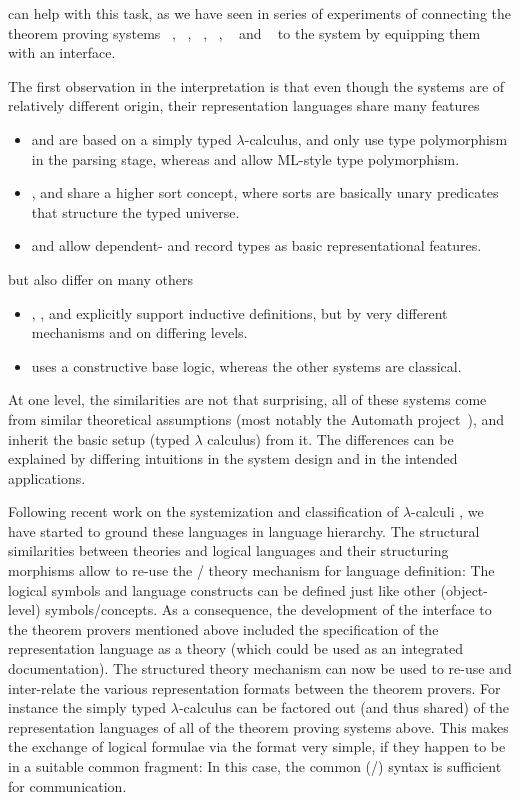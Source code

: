 {\omdoc} can help with this task, as we have seen in series of
experiments of connecting the theorem proving systems
{\OMEGA}~\cite{BenzmuellerEtAl:otama97}, {\inka}~\cite{HuSe:itng96},
{\pvs}~\cite{OwRu92}, {\lambdaclam}~\cite{RicSmaGre:ppihol98},
{\tps}~\cite{AnBi:tatps96} and {\coq}~\cite{CoqManual} to the {\mbase}
system by equipping them with an {\omdoc} interface.

The first observation in the interpretation is that even though the systems are of
relatively different origin, their representation languages share many features
\begin{itemize}
\item {\tps} and {\pvs} are based on a simply typed $\lambda$-calculus, and only
  use type polymorphism in the parsing stage, whereas {\OMEGA} and {\lambdaclam}
  allow ML-style type polymorphism.
\item {\OMEGA}, {\inka} and {\pvs} share a higher sort concept, where sorts are
  basically unary predicates that structure the typed universe.
\item {\pvs} and {\coq} allow dependent- and record types as basic
  representational features. 
\end{itemize}
but also differ on many others
\begin{itemize}
\item {\inka}, {\pvs}, and {\coq} explicitly support inductive definitions, but by
  very different mechanisms and on differing levels.
\item {\coq} uses a constructive base logic, whereas the other systems are classical.
\end{itemize}
At one level, the similarities are not that surprising, all of these systems come
from similar theoretical assumptions (most notably the Automath
project~\cite{Bruijn80}), and inherit the basic setup (typed $\lambda$ calculus)
from it. The differences can be explained by differing intuitions in the system
design and in the intended applications.

Following recent work on the systemization and classification of $\lambda$-calculi
{\cite{Barendregt:lcwt92}}, we have started to ground these languages in language
hierarchy. The structural similarities between theories and logical languages and
their structuring morphisms allow to re-use the {\omdoc}/{\mbase} theory mechanism
for language definition: The logical symbols and language constructs can be
defined just like other (object-level) symbols/concepts. As a consequence, the
development of the {\omdoc} interface to the theorem provers mentioned above
included the specification of the representation language as a theory (which could
be used as an integrated documentation). The structured theory mechanism can now
be used to re-use and inter-relate the various representation formats between the
theorem provers. For instance the simply typed $\lambda$-calculus can be factored
out (and thus shared) of the representation languages of all of the theorem
proving systems above. This makes the exchange of logical formulae via the
{\omdoc} format very simple, if they happen to be in a suitable common fragment:
In this case, the common ({\openmath}/{\omdoc}) syntax is sufficient for
communication.

